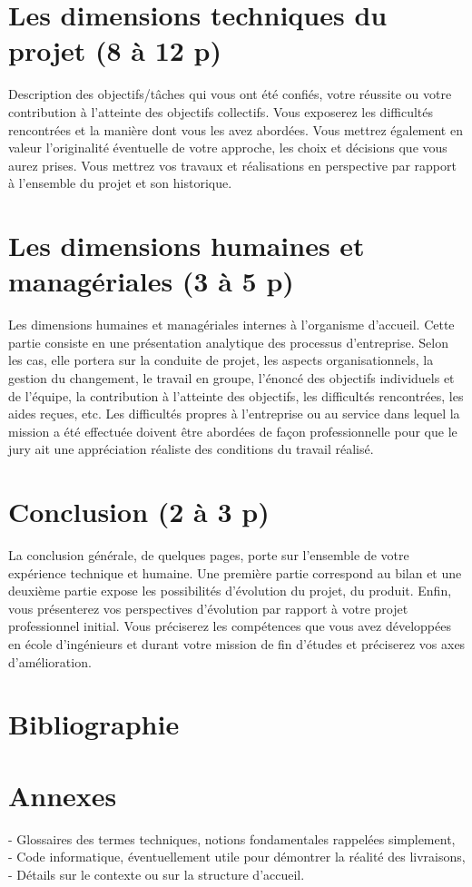 \documentclass[11pt]{article}
\begin{document}
  \pagebreak
  \section{Les dimensions techniques du projet (8 à 12 p)}
  Description des objectifs/tâches qui vous ont été confiés, votre réussite ou votre contribution à
  l’atteinte des objectifs collectifs. Vous exposerez les difficultés rencontrées et la manière dont vous
  les avez abordées. Vous mettrez également en valeur l’originalité éventuelle de votre approche, les
  choix et décisions que vous aurez prises. Vous mettrez vos travaux et réalisations en perspective par
  rapport à l’ensemble du projet et son historique.

  \pagebreak
  \section{Les dimensions humaines et managériales (3 à 5 p)}
  Les dimensions humaines et managériales internes à l’organisme d’accueil. Cette partie consiste en
  une présentation analytique des processus d’entreprise. Selon les cas, elle portera sur la conduite de
  projet, les aspects organisationnels, la gestion du changement, le travail en groupe, l’énoncé des
  objectifs individuels et de l’équipe, la contribution à l’atteinte des objectifs, les difficultés rencontrées,
  les aides reçues, etc. Les difficultés propres à l’entreprise ou au service dans lequel la mission a été
  effectuée doivent être abordées de façon professionnelle pour que le jury ait une appréciation réaliste
  des conditions du travail réalisé.  

  \pagebreak
  \section{Conclusion (2 à 3 p)}
  La conclusion générale, de quelques pages, porte sur l’ensemble de votre expérience technique et
  humaine. Une première partie correspond au bilan et une deuxième partie expose les possibilités
  d’évolution du projet, du produit. Enfin, vous présenterez vos perspectives d’évolution par rapport à
  votre projet professionnel initial. Vous préciserez les compétences que vous avez développées en
  école d’ingénieurs et durant votre mission de fin d’études et préciserez vos axes d’amélioration.

  \pagebreak
  \section{Bibliographie}

  \printbibliography[heading=none]

  \pagebreak
  \section{Annexes}
  - Glossaires des termes techniques, notions fondamentales rappelées simplement, \\
  - Code informatique, éventuellement utile pour démontrer la réalité des livraisons, \\
  - Détails sur le contexte ou sur la structure d’accueil. 
\end{document}
